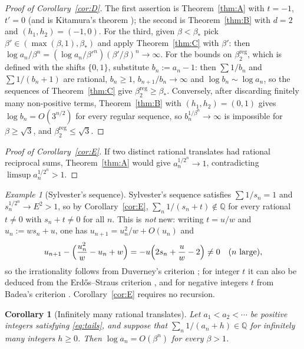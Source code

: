 \documentclass[11pt]{amsart}
\newtheorem{corollary}[lemma]{Corollary}
\theoremstyle{definition}
\theoremstyle{remark}
\newtheorem{example}[lemma]{Example}
\newcommand{\Q}{\mathbb{Q}}
\begin{document}
\begin{proof}[Proof of Corollary~\ref{cor:D}]
The first assertion is Theorem~\ref{thm:A} with $t=-1$, $t'=0$ (and is Kitamura's
theorem \cite{Kit26}); the second is Theorem~\ref{thm:B} with $d=2$ and
$(h_1,h_2)=(-1,0)$. For the third, given $\beta<\beta_*$ pick
$\beta'\in(\max(\beta,1),\beta_*)$ and apply Theorem~\ref{thm:C} with $\beta'$: then
$\log a_n/\beta^n=(\log a_n/\beta'^n)(\beta'/\beta)^n\to\infty$. For the bounds on
$\beta^{\mathrm{reg}}_2$, which is defined with the shifts $\{0,1\}$, substitute
$b_n:=a_n-1$: then $\sum1/b_n$ and $\sum1/(b_n+1)$ are rational, $b_n\ge1$,
$b_{n+1}/b_n\to\infty$ and $\log b_n\sim\log a_n$, so the sequences of
Theorem~\ref{thm:C} give $\beta^{\mathrm{reg}}_2\ge\beta_*$. Conversely, after discarding
finitely many non-positive terms, Theorem~\ref{thm:B} with $(h_1,h_2)=(0,1)$ gives
$\log b_n=O(3^{n/2})$ for every regular sequence, so $b_n^{1/\beta^n}\to\infty$ is
impossible for $\beta\ge\sqrt3$, and $\beta_2^{\mathrm{reg}}\le\sqrt3$.
\end{proof}

\begin{proof}[Proof of Corollary~\ref{cor:E}]
If two distinct rational translates had rational reciprocal sums, Theorem~\ref{thm:A}
would give $a_n^{1/2^n}\to1$, contradicting $\limsup a_n^{1/2^n}>1$.
\end{proof}

\begin{example}[Sylvester's sequence]\label{ex:sylvester}
Sylvester's sequence satisfies $\sum1/s_n=1$ and $s_n^{1/2^n}\to E^2>1$, so by
Corollary~\ref{cor:E}, $\sum_n1/(s_n+t)\notin\Q$ for every rational $t\ne0$ with
$s_n+t\neq0$ for all $n$. This is \emph{not} new: writing $t=u/w$ and $u_n:=ws_n+u$, one
has $u_{n+1}=u_n^2/w+O(u_n)$ and
\[
u_{n+1}-\Bigl(\frac{u_n^2}{w}-u_n+w\Bigr)=-u\Bigl(2s_n+\frac uw-2\Bigr)\neq0
\quad(n\text{ large}),
\]
so the irrationality follows from Duverney's criterion \cite[Cor.~3.4]{Duverney01}; for
integer $t$ it can also be deduced from the Erd\H{o}s--Straus criterion \cite{ErSt64},
and for negative integers $t$ from Badea's criterion \cite{Badea87}. Corollary~\ref{cor:E} requires no recursion.
\end{example}

\begin{corollary}[Infinitely many rational translates]\label{cor:many}
Let $a_1<a_2<\cdots$ be positive integers satisfying \eqref{eq:tails}, and suppose that
$\sum_n1/(a_n+h)\in\Q$ for infinitely many integers $h\ge0$. Then $\log a_n=O(\beta^n)$
for every $\beta>1$.
\end{corollary}
\end{document}
